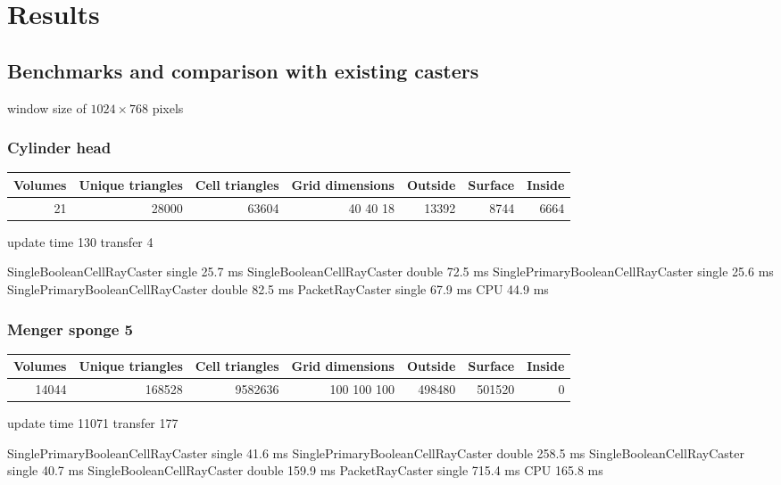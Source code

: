 \section{Results}
\label{sec:results}


\subsection{Benchmarks and comparison with existing casters}

window size of $1024 \times 768$ pixels

\subsubsection{Cylinder head}

\begin{tabular}{r r r r r r r}
Volumes & Unique triangles & Cell triangles & Grid dimensions & Outside & Surface & Inside \\
\hline
21 & 28000 & 63604 & 40 40 18 & 13392 & 8744 & 6664 \\
\end{tabular}

update time 130
transfer 4

SingleBooleanCellRayCaster single 25.7 ms
SingleBooleanCellRayCaster double 72.5 ms
SinglePrimaryBooleanCellRayCaster single 25.6 ms
SinglePrimaryBooleanCellRayCaster double 82.5 ms
PacketRayCaster single 67.9 ms
CPU 44.9 ms

\subsubsection{Menger sponge 5}

\begin{tabular}{r r r r r r r}
Volumes & Unique triangles & Cell triangles & Grid dimensions & Outside & Surface & Inside \\
\hline
14044 & 168528 & 9582636 & 100 100 100 & 498480 & 501520 & 0 \\
\end{tabular}

update time 11071
transfer 177

SinglePrimaryBooleanCellRayCaster single 41.6 ms
SinglePrimaryBooleanCellRayCaster double 258.5 ms
SingleBooleanCellRayCaster single 40.7 ms
SingleBooleanCellRayCaster double 159.9 ms
PacketRayCaster single 715.4 ms
CPU 165.8 ms

